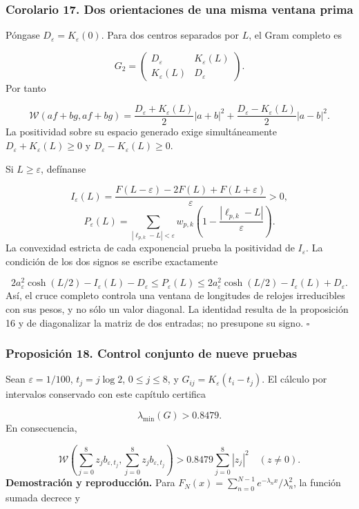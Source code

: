\subsubsection*{Corolario 17. Dos orientaciones de una misma ventana prima}
Póngase \(D_\varepsilon=K_\varepsilon(0)\). Para dos centros separados por \(L\), el Gram completo es

\[
G_2=\begin{pmatrix}D_\varepsilon&K_\varepsilon(L)\\
K_\varepsilon(L)&D_\varepsilon\end{pmatrix}.
\]
Por tanto

\[
\mathscr W(af+bg,af+bg)=
\frac{D_\varepsilon+K_\varepsilon(L)}2|a+b|^2
+\frac{D_\varepsilon-K_\varepsilon(L)}2|a-b|^2.
\]
La positividad sobre su espacio generado exige simultáneamente \(D_\varepsilon+K_\varepsilon(L)\geq0\) y \(D_\varepsilon-K_\varepsilon(L)\geq0\).

Si \(L\geq\varepsilon\), defínanse

\[
I_\varepsilon(L)=
\frac{F(L-\varepsilon)-2F(L)+F(L+\varepsilon)}{\varepsilon}>0,
\]
\[
P_\varepsilon(L)=
\sum_{|\ell_{p,k}-L|<\varepsilon}w_{p,k}
\left(1-\frac{|\ell_{p,k}-L|}{\varepsilon}\right).
\]
La convexidad estricta de cada exponencial prueba la positividad de \(I_\varepsilon\). La condición de los dos signos se escribe exactamente

\[
2a_\varepsilon^2\cosh(L/2)-I_\varepsilon(L)-D_\varepsilon
\leq P_\varepsilon(L)
\leq
2a_\varepsilon^2\cosh(L/2)-I_\varepsilon(L)+D_\varepsilon.
\]
Así, el cruce completo controla una ventana de longitudes de relojes irreducibles con sus pesos, y no sólo un valor diagonal. La identidad resulta de la proposición 16 y de diagonalizar la matriz de dos entradas; no presupone su signo. \hfill\(\square\)

\subsubsection*{Proposición 18. Control conjunto de nueve pruebas}
Sean \(\varepsilon=1/100\), \(t_j=j\log2\), \(0\leq j\leq8\), y \(G_{ij}=K_\varepsilon(t_i-t_j)\). El cálculo por intervalos conservado con este capítulo certifica

\[
\lambda_{\min}(G)>0.8479.
\]
En consecuencia,

\[
\mathscr W\left(\sum_{j=0}^8z_jb_{\varepsilon,t_j},
\sum_{j=0}^8z_jb_{\varepsilon,t_j}\right)
>0.8479\sum_{j=0}^8|z_j|^2
\quad(z\neq0).
\]
\textbf{Demostración y reproducción.} Para \(F_N(x)=\sum_{n=0}^{N-1}e^{-\lambda_nx}/\lambda_n^2\), la función sumada decrece y

